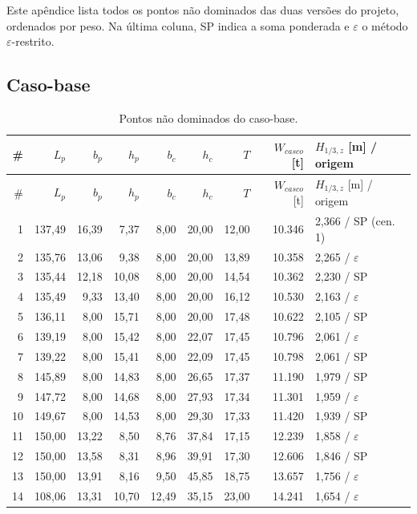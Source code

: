 \documentclass[11pt,a4paper]{article}
\newcommand{\Hz}{H_{1/3,z}}
\newcommand{\Wc}{W_{casco}}
\begin{document}
Este apêndice lista todos os pontos não dominados das duas versões do projeto, ordenados por peso.
Na última coluna, SP indica a soma ponderada e $\varepsilon$ o método $\varepsilon$-restrito.

\subsection{Caso-base}\label{ap:fronteira}

\begin{longtable}{rrrrrrrrl}
\caption{Pontos não dominados do caso-base.}\label{tab:fronteira}\\
\toprule
\# & $L_p$ & $b_p$ & $h_p$ & $b_c$ & $h_c$ & $T$ & $\Wc$ [t] & $\Hz$ [m] / origem \\
\midrule
\endfirsthead
\toprule
\# & $L_p$ & $b_p$ & $h_p$ & $b_c$ & $h_c$ & $T$ & $\Wc$ [t] & $\Hz$ [m] / origem \\
\midrule
\endhead
1 & 137,49 & 16,39 & 7,37 & 8,00 & 20,00 & 12,00 & 10.346 & 2,366 / SP (cen. 1) \\
2 & 135,76 & 13,06 & 9,38 & 8,00 & 20,00 & 13,89 & 10.358 & 2,265 / $\varepsilon$ \\
3 & 135,44 & 12,18 & 10,08 & 8,00 & 20,00 & 14,54 & 10.362 & 2,230 / SP \\
4 & 135,49 & 9,33 & 13,40 & 8,00 & 20,00 & 16,12 & 10.530 & 2,163 / $\varepsilon$ \\
5 & 136,11 & 8,00 & 15,71 & 8,00 & 20,00 & 17,48 & 10.622 & 2,105 / SP \\
6 & 139,19 & 8,00 & 15,42 & 8,00 & 22,07 & 17,45 & 10.796 & 2,061 / $\varepsilon$ \\
7 & 139,22 & 8,00 & 15,41 & 8,00 & 22,09 & 17,45 & 10.798 & 2,061 / SP \\
8 & 145,89 & 8,00 & 14,83 & 8,00 & 26,65 & 17,37 & 11.190 & 1,979 / SP \\
9 & 147,72 & 8,00 & 14,68 & 8,00 & 27,93 & 17,34 & 11.301 & 1,959 / $\varepsilon$ \\
10 & 149,67 & 8,00 & 14,53 & 8,00 & 29,30 & 17,33 & 11.420 & 1,939 / SP \\
11 & 150,00 & 13,22 & 8,50 & 8,76 & 37,84 & 17,15 & 12.239 & 1,858 / $\varepsilon$ \\
12 & 150,00 & 13,58 & 8,31 & 8,96 & 39,91 & 17,30 & 12.606 & 1,846 / SP \\
13 & 150,00 & 13,91 & 8,16 & 9,50 & 45,85 & 18,75 & 13.657 & 1,756 / $\varepsilon$ \\
14 & 108,06 & 13,31 & 10,70 & 12,49 & 35,15 & 23,00 & 14.241 & 1,654 / $\varepsilon$ \\

\end{longtable}
\end{document}
